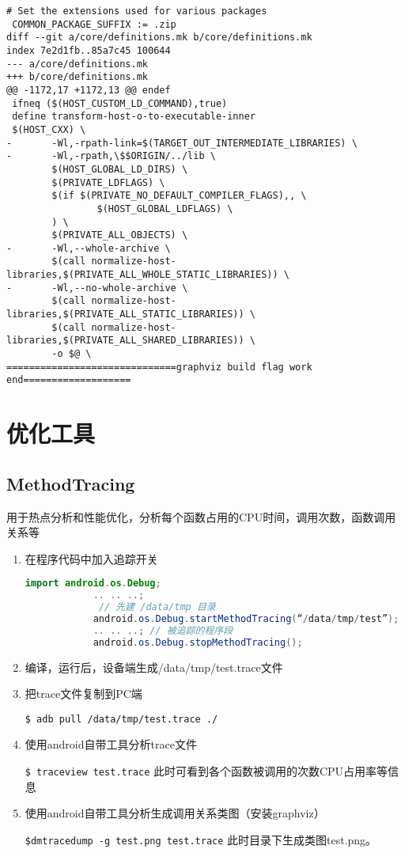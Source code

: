\documentclass[a4paper,titlepage]{article}
\begin{document}
\begin{Verbatim}[fontsize=\scriptsize]
 # Set the extensions used for various packages
 COMMON_PACKAGE_SUFFIX := .zip
diff --git a/core/definitions.mk b/core/definitions.mk
index 7e2d1fb..85a7c45 100644
--- a/core/definitions.mk
+++ b/core/definitions.mk
@@ -1172,17 +1172,13 @@ endef
 ifneq ($(HOST_CUSTOM_LD_COMMAND),true)
 define transform-host-o-to-executable-inner
 $(HOST_CXX) \
-       -Wl,-rpath-link=$(TARGET_OUT_INTERMEDIATE_LIBRARIES) \
-       -Wl,-rpath,\$$ORIGIN/../lib \
        $(HOST_GLOBAL_LD_DIRS) \
        $(PRIVATE_LDFLAGS) \
        $(if $(PRIVATE_NO_DEFAULT_COMPILER_FLAGS),, \
                $(HOST_GLOBAL_LDFLAGS) \
        ) \
        $(PRIVATE_ALL_OBJECTS) \
-       -Wl,--whole-archive \
        $(call normalize-host-libraries,$(PRIVATE_ALL_WHOLE_STATIC_LIBRARIES)) \
-       -Wl,--no-whole-archive \
        $(call normalize-host-libraries,$(PRIVATE_ALL_STATIC_LIBRARIES)) \
        $(call normalize-host-libraries,$(PRIVATE_ALL_SHARED_LIBRARIES)) \
        -o $@ \
==============================graphviz build flag work end===================
\end{Verbatim}

\section{优化工具}
\subsection{MethodTracing}
用于热点分析和性能优化，分析每个函数占用的CPU时间，调用次数，函数调用关系等

\begin{enumerate}
    \item 在程序代码中加入追踪开关
        \begin{lstlisting}[language=java]
            import android.os.Debug;
            .. .. ..;
             // 先建 /data/tmp 目录
            android.os.Debug.startMethodTracing(“/data/tmp/test”);
            .. .. ..; // 被追踪的程序段
            android.os.Debug.stopMethodTracing();
        \end{lstlisting}

    \item 编译，运行后，设备端生成/data/tmp/test.trace文件

    \item 把trace文件复制到PC端

        \lstinline{$ adb pull /data/tmp/test.trace ./}

    \item 使用android自带工具分析trace文件

        \lstinline{$ traceview test.trace}
        此时可看到各个函数被调用的次数CPU占用率等信息

    \item 使用android自带工具分析生成调用关系类图（安装graphviz）

        \lstinline{$dmtracedump -g test.png test.trace}
        此时目录下生成类图test.png。
\end{enumerate}
\end{document}
